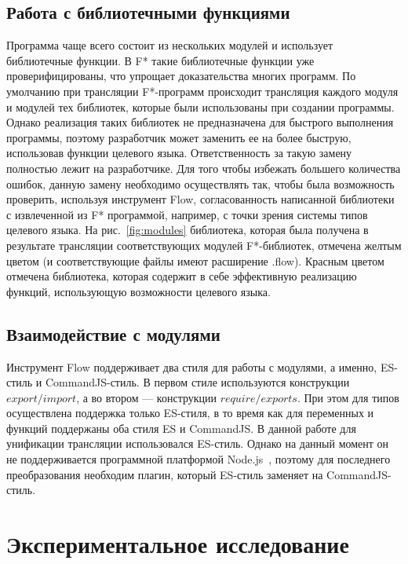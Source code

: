 \documentclass[12pt]{matmex-diploma}
\begin{document}
\subsection{Работа с библиотечными функциями}

Программа чаще всего состоит из нескольких модулей и использует библиотечные функции. В F* такие библиотечные функции уже проверифицированы, что упрощает доказательства многих программ. По умолчанию при трансляции F*-программ происходит трансляция каждого модуля и модулей тех библиотек, которые были использованы при создании программы. Однако реализация таких библиотек не предназначена для быстрого выполнения программы, поэтому разработчик может заменить ее на более быструю, использовав функции целевого языка. Ответственность за такую замену полностью лежит на разработчике. Для того чтобы избежать большего количества ошибок, данную замену необходимо осуществлять так, чтобы была возможность проверить, используя инструмент Flow, согласованность написанной библиотеки с извлеченной из F* программой, например, с точки зрения системы типов целевого языка. На рис.~\ref{fig:modules} библиотека, которая была получена в результате трансляции соответствующих модулей F*-библиотек, отмечена желтым цветом (и соответствующие файлы имеют расширение .flow). Красным цветом отмечена библиотека, которая содержит в себе эффективную реализацию функций, использующую возможности целевого языка. 

\subsection{Взаимодействие с модулями}

Инструмент Flow поддерживает два стиля для работы с модулями, а именно, ES-стиль и CommandJS-стиль. В первом стиле используются конструкции  $export/import$, а во втором --- конструкции $require/exports$. При этом для типов осуществлена поддержка только ES-стиля, в то время как для переменных и функций поддержаны оба стиля ES и CommandJS. В данной работе для унификации трансляции использовался ES-стиль. Однако на данный момент он не поддерживается программной платформой Node.js~\cite{node_js}, поэтому для последнего преобразования необходим плагин, который ES-стиль заменяет на CommandJS-стиль.

\section{Экспериментальное исследование}
\end{document}
